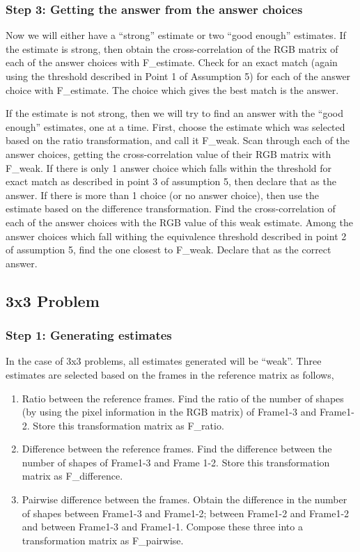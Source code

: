 \documentclass[10pt, letter]{article}
\begin{document}
\subsubsection*{Step 3: Getting the answer from the answer choices}
Now we will either have a ``strong'' estimate or two ``good enough'' estimates. If the estimate is strong, then obtain the cross-correlation of the RGB matrix of each of the answer choices with F\_estimate. Check for an exact match (again using the threshold described in Point 1 of Assumption 5) for each of the answer choice with F\_estimate. The choice which gives the best match is the answer.

If the estimate is not strong, then we will try to find an answer with the ``good enough'' estimates, one at a time. First, choose the estimate which was selected based on the ratio transformation, and call it F\_weak. Scan through each of the answer choices, getting the cross-correlation value of their RGB matrix with F\_weak. If there is only 1 answer choice which falls within the threshold for exact match as described in point 3 of assumption 5, then declare that as the answer. If there is more than 1 choice (or no answer choice), then use the estimate based on the difference transformation. Find the cross-correlation of each of the answer choices with the RGB value of this weak estimate. Among the answer choices which fall withing the equivalence threshold described in point 2 of assumption 5, find the one closest to F\_weak. Declare that as the correct answer.

\subsection*{3x3 Problem}
\subsubsection*{Step 1: Generating estimates}
In the case of 3x3 problems, all estimates generated will be ``weak''. Three estimates are selected based on the frames in the reference matrix as follows,
\begin{enumerate}
	\item Ratio between the reference frames. Find the ratio of the number of shapes (by using the pixel information in the RGB matrix) of Frame1-3 and Frame1-2. Store this transformation matrix as F\_ratio.
	\item Difference between the reference frames. Find the difference between the number of shapes of Frame1-3 and Frame 1-2. Store this transformation matrix as F\_difference.
	\item Pairwise difference between the frames. Obtain the difference in the number of shapes between Frame1-3 and Frame1-2; between Frame1-2 and Frame1-2 and between Frame1-3 and Frame1-1. Compose these three into a transformation matrix as F\_pairwise.
\end{enumerate}
\end{document}
